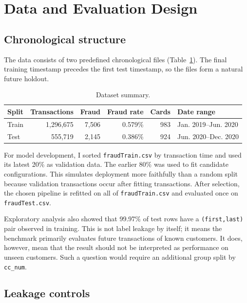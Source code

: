 \documentclass[11pt,a4paper]{article}
\newcommand{\code}[1]{\texttt{#1}}
\begin{document}
\section{Data and Evaluation Design}

\subsection{Chronological structure}

The data consists of two predefined chronological files (Table~\ref{tab:data}). The final training timestamp precedes the first test timestamp, so the files form a natural future holdout.

\begin{table}[H]
\centering
\caption{Dataset summary.}
\label{tab:data}
\begin{tabular}{lrrrrl}
\toprule
Split & Transactions & Fraud & Fraud rate & Cards & Date range \\
\midrule
Train & 1,296,675 & 7,506 & 0.579\% & 983 & Jan. 2019--Jun. 2020 \\
Test  &   555,719 & 2,145 & 0.386\% & 924 & Jun. 2020--Dec. 2020 \\
\bottomrule
\end{tabular}
\end{table}

For model development, I sorted \code{fraudTrain.csv} by transaction time and used its latest 20\% as validation data. The earlier 80\% was used to fit candidate configurations. This simulates deployment more faithfully than a random split because validation transactions occur after fitting transactions. After selection, the chosen pipeline is refitted on all of \code{fraudTrain.csv} and evaluated once on \code{fraudTest.csv}.

Exploratory analysis also showed that 99.97\% of test rows have a \code{(first,last)} pair observed in training. This is not label leakage by itself; it means the benchmark primarily evaluates future transactions of known customers. It does, however, mean that the result should not be interpreted as performance on unseen customers. Such a question would require an additional group split by \code{cc\_num}.

\subsection{Leakage controls}
\end{document}
